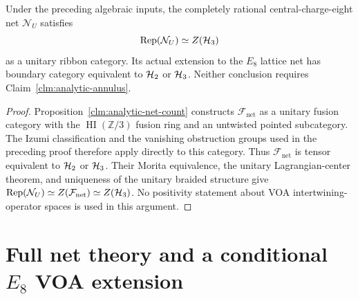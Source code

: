 \begin{corollary}
\label{cor:analytic-net-haagerup}
Under the preceding algebraic inputs, the completely rational
central-charge-eight net $\mathcal N_U$ satisfies
\[
 \operatorname{Rep}(\mathcal N_U)\simeq Z(\mathcal H_3)
\]
as a unitary ribbon category.  Its actual extension to the $E_8$
lattice net has boundary category equivalent to $\mathcal H_2$ or $\mathcal H_3$.
Neither conclusion requires Claim~\ref{clm:analytic-annulus}.
\end{corollary}
\begin{proof}
Proposition~\ref{clm:analytic-net-count} constructs
$\mathcal F_{\mathrm{net}}$ as a unitary fusion category with the
$\operatorname{HI}(\mathbb Z/3)$ fusion ring and an untwisted pointed
subcategory.  The Izumi classification and the vanishing obstruction
groups used in the preceding proof therefore apply directly to this
category.  Thus $\mathcal F_{\mathrm{net}}$ is tensor equivalent to
$\mathcal H_2$ or $\mathcal H_3$.  Their Morita equivalence, the unitary
Lagrangian-center theorem, and uniqueness of the unitary braided
structure give
$\operatorname{Rep}(\mathcal N_U)\simeq Z(\mathcal F_{\mathrm{net}})\simeq Z(\mathcal H_3)$.
No positivity statement about VOA intertwining-operator spaces is
used in this argument.
\end{proof}

\section{Full net theory and a conditional \texorpdfstring{$E_8$}{E8} VOA extension}
\label{sec:analytic-full-theory}

